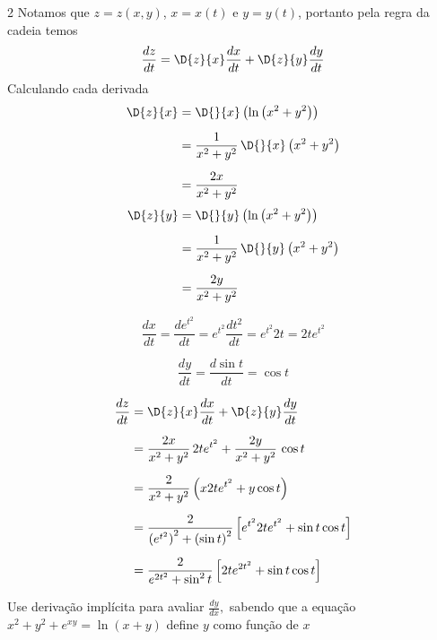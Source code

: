\documentclass[a4paper,12pt,fleqn]{article}
\begin{document}
\begin{answer}
\begin{multicols}{2}
  Notamos que \(z = z(x, y)\), \(x = x(t)\) e \(y = y(t)\),
  portanto pela regra da cadeia temos
  \[
    \frac{dz}{dt}
    = \D{z}{x} \frac{dx}{dt}
    + \D{z}{y} \frac{dy}{dt}
  \]
  Calculando cada derivada
  \begin{align*}
    \D{z}{x}
    & = \D{}{x} \left( \ln\left(x^2 + y^2\right) \right)
    \\[2mm]
    & = \frac{1}{x^2 + y^2} \, \D{}{x} \left( x^2 + y^2\right)
    \\[2mm]
    & = \frac{2x}{x^2 + y^2}
  \end{align*}
  \begin{align*}
    \D{z}{y}
    & = \D{}{y} \left( \ln\left(x^2 + y^2\right) \right)
    \\*[2mm]
    & = \frac{1}{x^2 + y^2} \, \D{}{y} \left( x^2 + y^2\right)
    \\*[2mm]
    & = \frac{2y}{x^2 + y^2}
  \end{align*}

  \[
    \frac{dx}{dt}
    = \frac{d e^{t^2}}{dt}
    = e^{t^2} \frac{d t^2}{dt}
    = e^{t^2} 2t
    = 2t e^{t^2}
  \]

  \[
    \frac{dy}{dt}
    = \frac{d \sin t}{dt}
    = \cos t
  \]

  \begin{align*}
    \frac{dz}{dt}
    & = \D{z}{x} \frac{dx}{dt}
      + \D{z}{y} \frac{dy}{dt}
    \\[2mm]
    & = \frac{2x}{x^2 + y^2} \, 2t e^{t^2}
      + \frac{2y}{x^2 + y^2} \, \cos t
    \\[2mm]
    & = \frac{2}{x^2 + y^2}
        \left(
          x 2t e^{t^2}
        + y \cos t
        \right)
    \\[2mm]
    & = \frac{2}{\left(e^{t^2}\right)^2 + \left(\sin t\right)^2}
        \left[
          e^{t^2} 2t e^{t^2}
          + \sin t \cos t
        \right]
    \\[2mm]
    & = \frac{2}{e^{2t^2} + \sin^2 t}
        \left[
          2t e^{2t^2}
          + \sin t \cos t
        \right]
  \end{align*}
\end{multicols}
\end{answer}

Use derivação implícita para avaliar \(\frac{dy}{dx},\)
sabendo que a equação
\(
  x^2 + y^2 + e^{xy} = \ln(x + y)
\)
define $y$ como função de $x$
\end{document}
